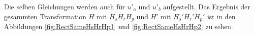 Die selben Gleichungen werden auch für $u'_a$ und $u'_b$ aufgestellt. Das Ergebnis der gesammten Transformation $H$ mit $H_sH_rH_p$ und $H'$ mit $H_s'H_r'H_p'$ ist in den Abbildungen \ref{fig:RectSameHsHrHp1} und \ref{fig:RectSameHsHrHp2} zu sehen.\\



%


